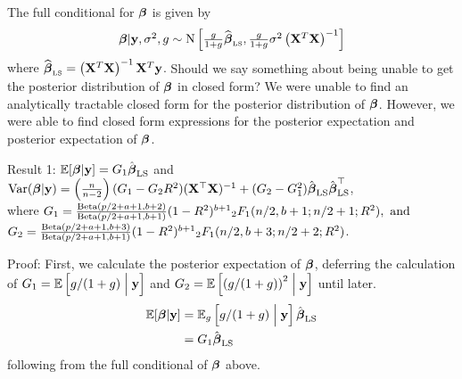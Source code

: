 \documentclass{amsart}[12pt]
\newcommand{\mgc}[1]{{\color{blue}#1}}
\begin{document}
 

\noindent The full conditional for ${\boldsymbol \beta}$ is given by
\begin{equation}
	\begin{array}{rl}
		{\boldsymbol\beta}|{\bf y},\sigma^2,g \sim \text{N}\left[                  
		\tfrac{g}{1+g}\widehat{{\boldsymbol \beta}}_{\mbox{\tiny LS}},    
		\tfrac{g}{1+g} \sigma^2 \left( {\bf X}^T{\bf X} \right)^{-1} 
		\right]                                              
	\end{array} 
\end{equation}
\noindent where $\widehat{{\boldsymbol \beta}}_{\mbox{\tiny LS}} = \left( {\bf X}^T{\bf X} \right)^{-1}{\bf X}^T{\bf y}$. \mgc{Should we
say something about being unable to get the posterior distribution of ${\boldsymbol \beta}$ in closed form?} We were unable
to find an analytically tractable closed form for the posterior distribution of ${\boldsymbol \beta}$. However, we were
able to find closed form expressions for the posterior expectation and posterior expectation of ${\boldsymbol \beta}$.

Result 1: $\mathbb{E}[{\boldsymbol \beta} | {\bf y}] = G_1 \hat{{\boldsymbol \beta}}_{\text{LS}}$ and
					$\text{Var}({\boldsymbol \beta} | {\bf y}) = \left( \frac{n}{n - 2} \right) (G_1 - G_2 R^2) ({\bf X}^\top {\bf X})^{-1} + (G_2 - G_1^2) \hat{{\boldsymbol \beta}}_{\text{LS}} \hat{{\boldsymbol \beta}}_{\text{LS}}^\top$,
	\\ where
	$G_1 = \frac{\text{Beta}(p/2 + a + 1, b + 2)}{\text{Beta}(p /2 + a + 1, b + 1)} (1 - R^2)^{b+1} {}_2 F_1(n/2, b + 1; n/2 + 1; R^2), \text{ and }$ \\
	$G_2 = \frac{\text{Beta}(p/2 + a + 1, b + 3)}{\text{Beta}(p /2 + a + 1, b + 1)} (1 - R^2)^{b+1} {}_2 F_1(n/2, b + 3; n/2 + 2; R^2)$.

Proof:
First, we calculate the posterior expectation of ${\boldsymbol \beta}$, deferring the calculation of
$G_1 = \mathbb{E}\left[g/(1+g) \Bigm| {\bf y} \right]$ and $G_2 = \mathbb{E}\left[ \left(g/(1+g) \right)^2 \Bigm| {\bf y} \right]$
until later.
\begin{align*}
	\mathbb{E}[{\boldsymbol \beta} | {\bf y}] &= \mathbb{E}_g \left[g/(1+g) \Bigm| {\bf y} \right] \hat{{\boldsymbol \beta}}_{\text{LS}} \\
	&= G_1 \hat{{\boldsymbol \beta}}_{\text{LS}}
\end{align*}
following from the full conditional of ${\boldsymbol \beta}$ above.
\end{document}
